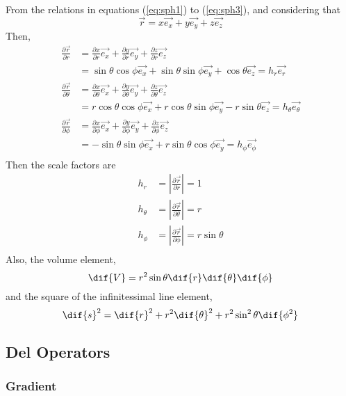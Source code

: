 \begin{example}
  From the relations in equations (\ref{eq:sph1}) to (\ref{eq:sph3}),
  and considering that
  \[ \vec{r} = x \vec{e_x} + y \vec{e_y} + z \vec{e_{z}} \] Then,
  \begin{align*}
    \frac{\partial \vec r}{\partial r}
    &= \frac{\partial x}{\partial r} \vec{e_x} + \frac{\partial y}{\partial r} \vec{e_y} + \frac{\partial z}{\partial r} \vec{e_z} \\
    &= \sin \theta \cos \phi \vec{e_{x}} + \sin\theta \sin \phi \vec{e_y} + \cos \theta \vec{e_z} = h_r\vec{e_r} \\
    \frac{\partial \vec r}{\partial \theta}
    &= \frac{\partial x}{\partial \theta} \vec{e_x} + \frac{\partial y}{\partial \theta} \vec{e_y} + \frac{\partial z}{\partial \theta} \vec{e_z} \\
    &= r \cos \theta \cos \phi \vec{e_x} + r \cos \theta \sin \phi \vec{e_y} - r \sin \theta \vec{e_z} = h_{\theta}\vec{e_{\theta}} \\
    \frac{\partial \vec r}{\partial \phi}
    &= \frac{\partial x}{\partial \phi} \vec{e_x} + \frac{\partial y}{\partial \phi} \vec{e_y} + \frac{\partial z}{\partial \phi} \vec{e_z} \\
    &= - \sin \theta \sin \phi \vec{e_{x}} + r \sin\theta \cos \phi \vec{e_y} = h_{\phi}\vec{e_{\phi}} \\
  \end{align*}
  Then the scale factors are
  \begin{align*}
    h_r &= \left| \frac{\partial \vec r}{\partial r} \right| = 1\\
    h_{\theta} &= \left| \frac{\partial \vec r}{\partial \theta} \right| = r\\
    h_{\phi} &= \left|  \frac{\partial \vec r}{\partial \phi} \right| = r \sin \theta\\
  \end{align*}
  Also, the volume element,
  \[ \dif{V} = r^2 \sin \theta \dif{r} \dif{\theta} \dif{\phi} \] and
  the square of the infinitessimal line element,
  \[ \dif{s}^2 = \dif{r}^2 + r^2 \dif{\theta}^2 + r^2 \sin^2 \theta
  \dif{\phi^2} \]
\end{example}

\subsection{Del Operators}
\label{sec:delcurvi}

\subsubsection{Gradient}
\label{sec:gradcurvi}

